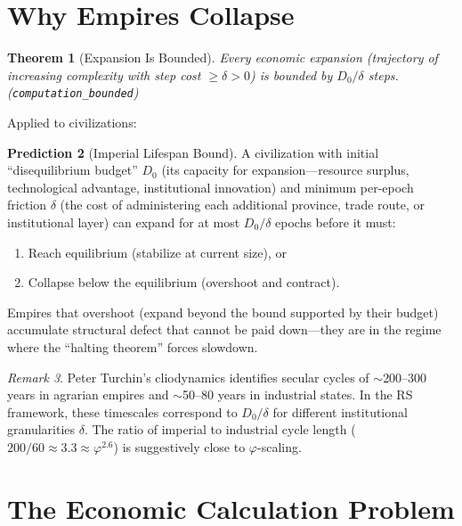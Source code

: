 \documentclass[11pt,a4paper]{article}
\theoremstyle{plain}
\newtheorem{theorem}{Theorem}[section]
\theoremstyle{definition}
\newtheorem{prediction}[theorem]{Prediction}
\theoremstyle{remark}
\newtheorem{remark}[theorem]{Remark}
\begin{document}
\section{Why Empires Collapse}\label{sec:empires}

\begin{theorem}[Expansion Is Bounded]
Every economic expansion (trajectory of increasing complexity with step cost $\ge \delta > 0$) is bounded by $D_0/\delta$ steps.
\emph{(\texttt{computation\_bounded})}
\end{theorem}

Applied to civilizations:

\begin{prediction}[Imperial Lifespan Bound]\label{pred:empire}
A civilization with initial ``disequilibrium budget'' $D_0$ (its capacity for expansion---resource surplus, technological advantage, institutional innovation) and minimum per-epoch friction $\delta$ (the cost of administering each additional province, trade route, or institutional layer) can expand for at most $D_0/\delta$ epochs before it must:
\begin{enumerate}[nosep]
\item Reach equilibrium (stabilize at current size), or
\item Collapse below the equilibrium (overshoot and contract).
\end{enumerate}
Empires that overshoot (expand beyond the bound supported by their budget) accumulate structural defect that cannot be paid down---they are in the regime where the ``halting theorem'' forces slowdown.
\end{prediction}

\begin{remark}
Peter Turchin's cliodynamics identifies secular cycles of $\sim$200--300 years in agrarian empires and $\sim$50--80 years in industrial states.
In the RS framework, these timescales correspond to $D_0/\delta$ for different institutional granularities $\delta$.
The ratio of imperial to industrial cycle length ($200/60 \approx 3.3 \approx \varphi^{2.6}$) is suggestively close to $\varphi$-scaling.
\end{remark}

\section{The Economic Calculation Problem}\label{sec:calculation}
\end{document}

